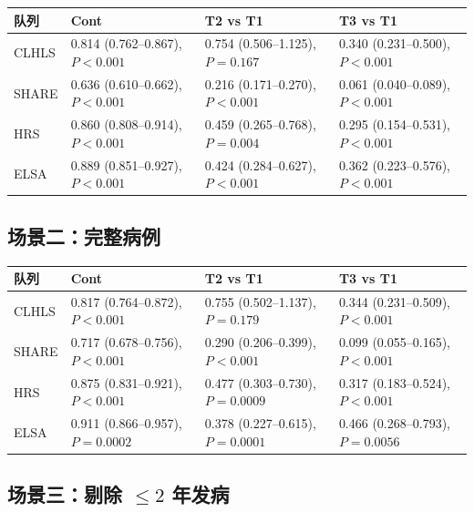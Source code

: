 \documentclass[11pt,a4paper]{article}
\begin{document}
\begin{center}\footnotesize
\begin{tabular}{lp{4.6cm}p{4.6cm}p{4.6cm}}
\toprule
队列 & Cont & T2 vs T1 & T3 vs T1 \\
\midrule
CLHLS & 0.814 (0.762--0.867), $P{<}0.001$ & 0.754 (0.506--1.125), $P{=}0.167$ & 0.340 (0.231--0.500), $P{<}0.001$ \\
SHARE & 0.636 (0.610--0.662), $P{<}0.001$ & 0.216 (0.171--0.270), $P{<}0.001$ & 0.061 (0.040--0.089), $P{<}0.001$ \\
HRS & 0.860 (0.808--0.914), $P{<}0.001$ & 0.459 (0.265--0.768), $P{=}0.004$ & 0.295 (0.154--0.531), $P{<}0.001$ \\
ELSA & 0.889 (0.851--0.927), $P{<}0.001$ & 0.424 (0.284--0.627), $P{<}0.001$ & 0.362 (0.223--0.576), $P{<}0.001$ \\
\bottomrule
\end{tabular}
\end{center}

\subsection{场景二：完整病例}

\begin{center}\footnotesize
\begin{tabular}{lp{4.6cm}p{4.6cm}p{4.6cm}}
\toprule
队列 & Cont & T2 vs T1 & T3 vs T1 \\
\midrule
CLHLS & 0.817 (0.764--0.872), $P{<}0.001$ & 0.755 (0.502--1.137), $P{=}0.179$ & 0.344 (0.231--0.509), $P{<}0.001$ \\
SHARE & 0.717 (0.678--0.756), $P{<}0.001$ & 0.290 (0.206--0.399), $P{<}0.001$ & 0.099 (0.055--0.165), $P{<}0.001$ \\
HRS & 0.875 (0.831--0.921), $P{<}0.001$ & 0.477 (0.303--0.730), $P{=}0.0009$ & 0.317 (0.183--0.524), $P{<}0.001$ \\
ELSA & 0.911 (0.866--0.957), $P{=}0.0002$ & 0.378 (0.227--0.615), $P{=}0.0001$ & 0.466 (0.268--0.793), $P{=}0.0056$ \\
\bottomrule
\end{tabular}
\end{center}

\subsection{场景三：剔除 $\le 2$ 年发病}
\end{document}

